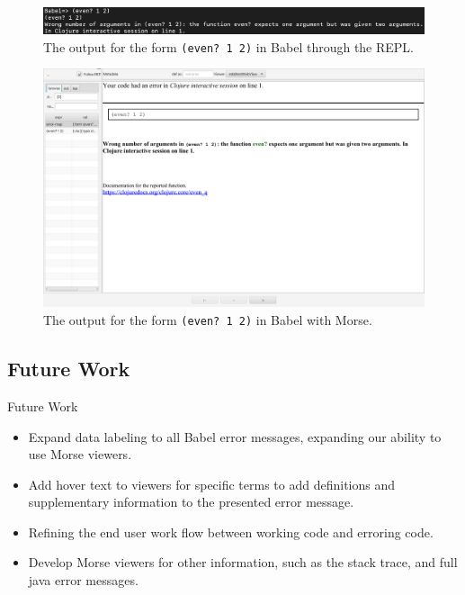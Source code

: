 \documentclass{beamer}
\begin{document}
\begin{frame}
  \begin{figure}
    \centering
    \includegraphics[width=\textwidth, height=0.25\textheight]{../resources/BabelREPL.png}
    \caption{The output for the form \texttt{(even? 1 2)} in Babel through the REPL.}
    \label{fig:BabelREPL}
  \end{figure}
\end{frame}

\begin{frame}
  \begin{figure}
    \centering
    \includegraphics[width=\textwidth]{../resources/BabelViewerExample.png}
    \caption{The output for the form \texttt{(even? 1 2)} in Babel with Morse.}
    \label{fig:defaultclj}
  \end{figure}
\end{frame}

\subsection{Future Work}
\begin{frame}{Future Work}
  \begin{itemize}
    \item<1-> Expand data labeling to all Babel error messages, expanding our ability to use Morse viewers.
    \item<2-> Add hover text to viewers for specific terms to add definitions and supplementary information to the presented error message.
    \item<3-> Refining the end user work flow between working code and erroring code.
    \item<4-> Develop Morse viewers for other information, such as the stack trace, and full java error messages.
  \end{itemize}
  \end{frame}
\end{document}
